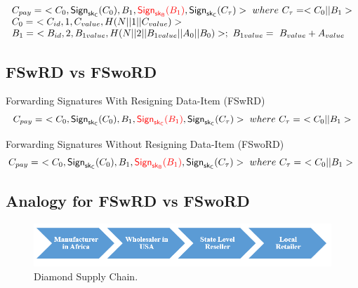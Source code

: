 \documentclass[%
  slidesonly,%
  semlayer%
  ]{seminar}                                  %
\newcommand{\sk}{\sf{sk}}
\begin{document}
\begin{slide}
      \begin{equation*}  
        \begin{array}{l}
          C_{pay} =\ <C_{0},\textsf{Sign}_{\sk_{C}}(C_{0}),B_{1},\textcolor{red}{\textsf{Sign}_{\sk_{B}}(B_{1})}, \textsf{Sign}_{\sk_{C}}(C_{\tau})>\ where\ C_{\tau} = <C_{0} || B_{1}>\\
          C_{0} =\ <C_{id}, 1, C_{value}, H(N||1||C_{value})>\\
          B_{1} =\ <B_{id}, 2, B_{1value}, H(N||2||B_{1value}||A_{0}||B_{0})>;\ B_{1value} =\ B_{value} + A_{value}
        \end{array}
      \end{equation*}
      \vfill
      \clearpage

    \subsection*{FSwRD vs FSwoRD}

      Forwarding Signatures With Resigning Data-Item (FSwRD)
      \begin{equation*}  
        \begin{array}{l}
          C_{pay} =\ <C_{0},\textsf{Sign}_{\sk_{C}}(C_{0}),B_{1},\textcolor{red}{\textsf{Sign}_{\sk_{C}}(B_{1})}, \textsf{Sign}_{\sk_{C}}(C_{\tau})>\ where\ C_{\tau} =\ <C_{0} || B_{1}>\\
        \end{array}
      \end{equation*}

      Forwarding Signatures Without Resigning Data-Item (FSwoRD)
      \begin{equation*}
          C_{pay} =\ <C_{0}, \textsf{Sign}_{\sk_{C}}(C_{0}), B_{1}, \textcolor{red}{\textsf{Sign}_{\sk_{B}}(B_{1})}, \textsf{Sign}_{\sk_{C}}(C_{\tau}) >\ where\ C_{\tau} =\ <C_{0} || B_{1}>\\
      \end{equation*}
      
      \vfill
      \clearpage

    \subsection*{Analogy for FSwRD vs FSwoRD}
      \begin{figure}[h!]
        \centering
        \includegraphics[scale=0.5]{images/diamond-supply-chain.png}
        \caption{Diamond Supply Chain.}
        \label{fig:diamond-supply-chain}
      \end{figure}
      \vfill
      \clearpage


\end{slide}
\end{document}
